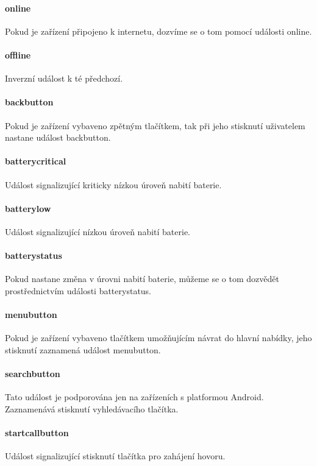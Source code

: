 \paragraph{online}
Pokud je zařízení připojeno k internetu, dozvíme se o tom pomocí události online.

\paragraph{offline}
Inverzní událost k té předchozí.

\paragraph{backbutton}
Pokud je zařízení vybaveno zpětným tlačítkem, tak při jeho stisknutí uživatelem nastane událost backbutton.

\paragraph{batterycritical}
Událost signalizující kriticky nízkou úroveň nabití baterie.

\paragraph{batterylow}
Událost signalizující nízkou úroveň nabití baterie.

\paragraph{batterystatus}
Pokud nastane změna v úrovni nabití baterie, můžeme se o tom dozvědět prostřednictvím události batterystatus.

\paragraph{menubutton}
Pokud je zařízení vybaveno tlačítkem umožňujícím návrat do hlavní nabídky, jeho stisknutí zaznamená událost menubutton.

\paragraph{searchbutton}
Tato událost je podporována jen na zařízeních s platformou Android. Zaznamenává stisknutí vyhledávacího tlačítka.

\paragraph{startcallbutton}
Událost signalizující stisknutí tlačítka pro zahájení hovoru.

